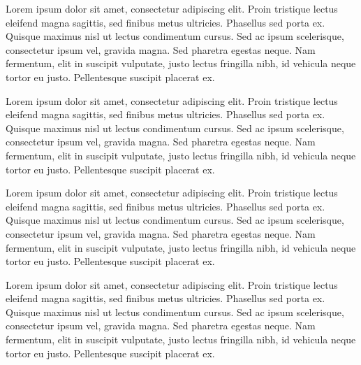 
\def\lorem{Lorem ipsum dolor sit amet, consectetur adipiscing elit.
Proin tristique lectus eleifend magna sagittis, sed finibus metus
ultricies. Phasellus sed porta ex. Quisque maximus nisl ut lectus
condimentum cursus. Sed ac ipsum scelerisque, consectetur ipsum vel,
gravida magna. Sed pharetra egestas neque. Nam fermentum, elit in
suscipit vulputate, justo lectus fringilla nibh, id vehicula neque
tortor eu justo. Pellentesque suscipit placerat ex.}

\lorem

{
   \lorem\par}


\lorem


{
   \lorem\par}

\bye
